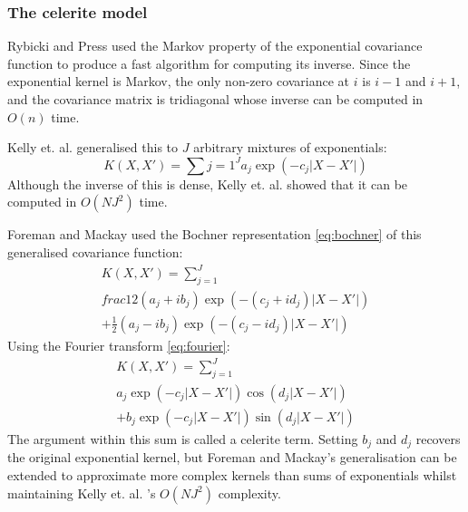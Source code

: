\subsubsection{The celerite model}
Rybicki and Press \cite{fast-exp} used the Markov property of the exponential covariance function to produce a fast algorithm for computing its inverse. Since the exponential kernel is Markov, the only non-zero covariance at $i$ is $i-1$ and $i+1$, and the covariance matrix is tridiagonal whose inverse can be computed in $O(n)$ time. 

Kelly et. al. \cite{general-exp} generalised this to $J$ arbitrary mixtures of exponentials:
\begin{equation*}
    K(X, X') = \sum{j=1}^J a_j \exp(-c_j |X - X'|)
\end{equation*}
Although the inverse of this is dense, Kelly et. al. \cite{general-exp} showed that it can be computed in $O(N J^2)$ time.

Foreman and Mackay \cite{foreman-mackay} used the Bochner representation \ref{eq:bochner} of this generalised covariance function: %
\begin{equation*}
    \begin{aligned}
        K(X, X') = \sum_{j=1}^J \\
        frac{1}{2} (a_j + i b_j) \exp(-(c_j + i d_j) |X - X'|) \\
        + \frac{1}{2} (a_j - i b_j) \exp(-(c_j - i d_j) |X - X'|)
    \end{aligned}
\end{equation*}
Using the Fourier transform \ref{eq:fourier}:
\begin{equation} \label{eq:celerite}
    \begin{aligned}
        K(X, X') = \sum_{j=1}^J \\
        a_j \exp(-c_j |X - X'|) \cos(d_j |X - X'|) \\ 
        + b_j \exp(-c_j |X - X'|) \sin(d_j |X - X'|)
    \end{aligned}
\end{equation}
The argument within this sum is called a celerite term. Setting $b_j$ and $d_j$ recovers the original exponential kernel, but Foreman and Mackay's \cite{foreman-mackay} generalisation can be extended to approximate more complex kernels than sums of exponentials whilst maintaining Kelly et. al. \cite{general-exp}'s $O(N J^2)$ complexity.


